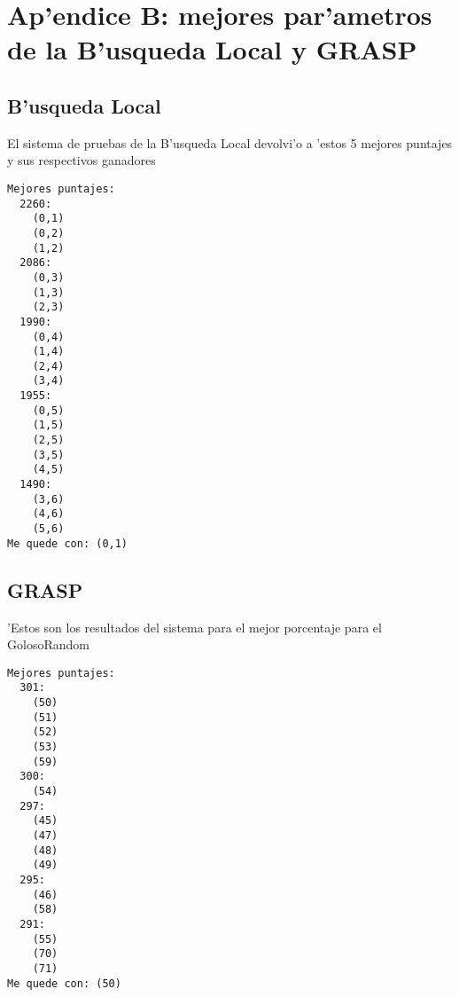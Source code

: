 \section{Ap'endice B: mejores par'ametros de la B'usqueda Local y GRASP}
\subsection{B'usqueda Local}
El sistema de pruebas de la B'usqueda Local devolvi'o a 'estos 5 mejores puntajes y sus respectivos ganadores
\begin{verbatim}
Mejores puntajes:
  2260:
    (0,1)
    (0,2)
    (1,2)
  2086:
    (0,3)
    (1,3)
    (2,3)
  1990:
    (0,4)
    (1,4)
    (2,4)
    (3,4)
  1955:
    (0,5)
    (1,5)
    (2,5)
    (3,5)
    (4,5)
  1490:
    (3,6)
    (4,6)
    (5,6)
Me quede con: (0,1)
\end{verbatim}

\subsection{GRASP}
'Estos son los resultados del sistema para el mejor porcentaje para el GolosoRandom
\begin{verbatim}
Mejores puntajes:
  301:
    (50)
    (51)
    (52)
    (53)
    (59)
  300:
    (54)
  297:
    (45)
    (47)
    (48)
    (49)
  295:
    (46)
    (58)
  291:
    (55)
    (70)
    (71)
Me quede con: (50)
\end{verbatim}
